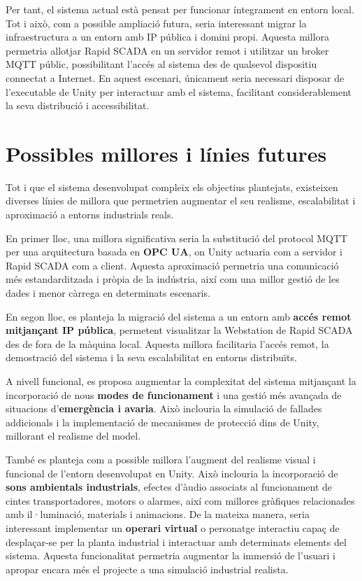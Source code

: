 \documentclass[12pt,a4paper]{report}
\begin{document}
Per tant, el sistema actual està pensat per funcionar íntegrament en entorn local. Tot i això, com a possible ampliació futura, seria interessant migrar la infraestructura a un entorn amb IP pública i domini propi. Aquesta millora permetria allotjar Rapid SCADA en un servidor remot i utilitzar un broker MQTT públic, possibilitant l'accés al sistema des de qualsevol dispositiu connectat a Internet. En aquest escenari, únicament seria necessari disposar de l'executable de Unity per interactuar amb el sistema, facilitant considerablement la seva distribució i accessibilitat.


\chapter{Possibles millores i línies futures}

Tot i que el sistema desenvolupat compleix els objectius plantejats, existeixen diverses línies de millora que permetrien augmentar el seu realisme, escalabilitat i aproximació a entorns industrials reals.

En primer lloc, una millora significativa seria la substitució del protocol MQTT per una arquitectura basada en \textbf{OPC UA}, on Unity actuaria com a servidor i Rapid SCADA com a client. Aquesta aproximació permetria una comunicació més estandarditzada i pròpia de la indústria, així com una millor gestió de les dades i menor càrrega en determinats escenaris.

En segon lloc, es planteja la migració del sistema a un entorn amb \textbf{accés remot mitjançant IP pública}, permetent visualitzar la Webstation de Rapid SCADA des de fora de la màquina local. Aquesta millora facilitaria l'accés remot, la demostració del sistema i la seva escalabilitat en entorns distribuïts.

A nivell funcional, es proposa augmentar la complexitat del sistema mitjançant la incorporació de nous \textbf{modes de funcionament} i una gestió més avançada de situacions d'\textbf{emergència i avaria}. Això inclouria la simulació de fallades addicionals i la implementació de mecanismes de protecció dins de Unity, millorant el realisme del model.

També es planteja com a possible millora l'augment del realisme visual i funcional de l'entorn desenvolupat en Unity. Això inclouria la incorporació de \textbf{sons ambientals industrials}, efectes d'àudio associats al funcionament de cintes transportadores, motors o alarmes, així com millores gràfiques relacionades amb il·luminació, materials i animacions. De la mateixa manera, seria interessant implementar un \textbf{operari virtual} o personatge interactiu capaç de desplaçar-se per la planta industrial i interactuar amb determinats elements del sistema. Aquesta funcionalitat permetria augmentar la immersió de l'usuari i apropar encara més el projecte a una simulació industrial realista.
\end{document}
